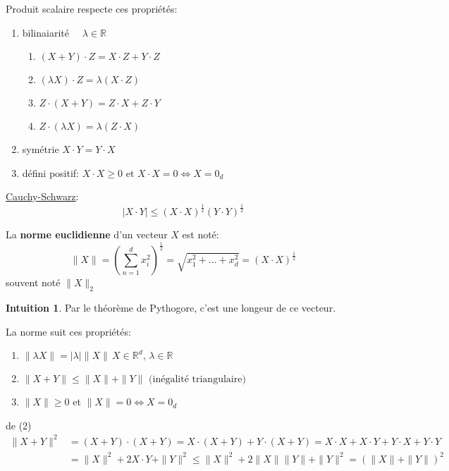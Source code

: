 \documentclass[a4paper]{report}
\newcommand\R{\ensuremath{\mathbb{R}}}
\let\iff\Leftrightarrow
\theoremstyle{definition}
\newtheorem*{intuition}{Intuition}
\begin{document}
\begin{prop}
    Produit scalaire respecte ces propriétés:
    \begin{enumerate}
        \item bilinaiarité $\quad \lambda \in \R$
            \begin{enumerate}
                \item $(X + Y) \cdot Z = X \cdot Z + Y \cdot Z$
                \item $(\lambda X) \cdot Z = \lambda (X \cdot Z)$
                \item $Z \cdot (X + Y) = Z \cdot X + Z \cdot Y$ 
                \item $Z \cdot (\lambda X) = \lambda (Z \cdot X)$
            \end{enumerate}
        \item symétrie $X \cdot Y = Y \cdot X$
        \item défini positif:  $X \cdot X \ge 0$ et $X \cdot X = 0 \iff X = 0_d$
    \end{enumerate}
\end{prop}
\begin{prop}
    \underline{Cauchy-Schwarz}:\\ 
    \[
        |X \cdot Y| \le (X \cdot X)^{\frac{1}{2}}(Y \cdot Y)^{\frac{1}{2}}
    \] 
\end{prop}
\begin{definition}\label{def:norm_eucl}
    La \textbf{norme euclidienne} d'un vecteur $X$ est noté:
   \[
       \|X\| = \left(\sum_{n=1}^{d} x_i^2\right)^{\frac{1}{2}} = \sqrt{x_1^2 + \ldots + x_d^2} = (X \cdot X)^{\frac{1}{2}}
   \] 
   souvent noté $\|X\|_2$
\end{definition}
\begin{intuition}
   Par le théorème de Pythogore, c'est une longeur de ce vecteur. 
\end{intuition}
\begin{prop}
    La norme suit ces propriétés:
   \begin{enumerate}
       \item $\|\lambda X\| = |\lambda|\|X\| \, X \in \R^d, \, \lambda \in \R$
       \item $\|X + Y\| \le \|X\| + \|Y\| \text{ (inégalité triangulaire)}$
       \item $\|X\| \ge 0$ et $\|X\| = 0 \iff X = 0_d$
   \end{enumerate}
\end{prop}
\begin{explanation}
    de (2)
    \begin{align*}
        \|X + Y\|^2 &= (X + Y)\cdot(X + Y) = X \cdot (X + Y) + Y \cdot (X + Y) = X \cdot X + X \cdot Y + Y \cdot X + Y \cdot Y\\
                    &= \|X\|^2 + 2X \cdot Y + \|Y\|^2 \le \|X\|^2 + 2\|X\| \|Y\| + \|Y\|^2 = (\|X\| + \|Y\|)^2
    \end{align*}
\end{explanation}
\end{document}
